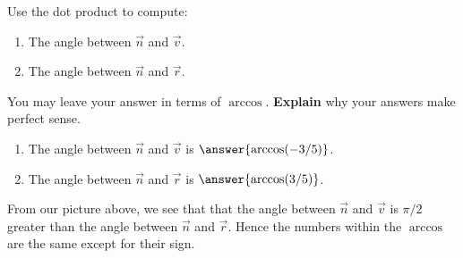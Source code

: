 \documentclass{ximera}
\begin{document}
  

  
  \begin{problem}
    Use the dot product to compute: 
    \begin{enumerate}
    \item The angle between $\vec{n}$ and $\vec{v}$.
    \item The angle between $\vec{n}$ and $\vec{r}$.
    \end{enumerate}
    You may leave your answer in terms of $\arccos$. \textbf{Explain}
    why your answers make perfect sense.
    \begin{prompt}
      \begin{enumerate}
      \item The angle between $\vec{n}$ and $\vec{v}$ is $\answer{\arccos(-3/5)}$.
      \item The angle between $\vec{n}$ and $\vec{r}$ is $\answer{\arccos(3/5)}$.
      \end{enumerate}
      \begin{problem}
        From our picture above, we see that that the angle between
        $\vec{n}$ and $\vec{v}$ is $\pi/2$ greater than the angle
        between $\vec{n}$ and $\vec{r}$. Hence the numbers within the
        $\arccos$ are the same except for their sign.
      \end{problem}
    \end{prompt}

    \vfill
    
  \end{problem}
  
\end{document}
